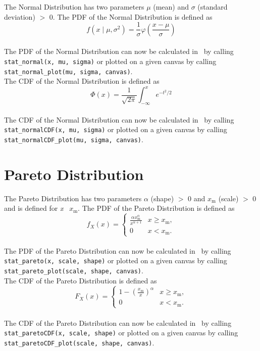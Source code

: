 		The Normal Distribution has two parameters $\mu$ (mean) and $\sigma$ (standard deviation) $>$ 0. The \ac{PDF} of the Normal Distribution is defined as
		\\
		$$f(x \mid \mu, \sigma^2) =\frac 1 \sigma \varphi\left(\frac{x-\mu} \sigma \right)$$
		\\[0.3cm]
		The \ac{PDF} of the Normal Distribution can now be calculated in \setlx\ by calling \lstinline{stat_normal(x, mu, sigma)} or plotted on a given canvas by calling \lstinline{stat_normal_plot(mu, sigma, canvas)}.
		\\[0.3cm]
		The \ac{CDF} of the Normal Distribution is defined as
		\\
		$$\Phi(x) = \frac 1 {\sqrt{2\pi}} \int_{-\infty}^x e^{-t^2/2}$$
		\\[0.3cm]
		The \ac{CDF} of the Normal Distribution can now be calculated in \setlx\ by calling \lstinline{stat_normalCDF(x, mu, sigma)} or plotted on a given canvas by calling \lstinline{stat_normalCDF_plot(mu, sigma, canvas)}.
		
	\section{Pareto Distribution}
	
		The Pareto Distribution has two parameters $\alpha$ (shape) $>$ 0 and $x_\mathrm{m}$ (scale) $>$ 0 and is defined for \textit{x} \geq\ $x_\mathrm{m}$. The \ac{PDF} of the Pareto Distribution is defined as
		\\
		$$f_X(x)= \begin{cases} \frac{\alpha x_\mathrm{m}^\alpha}{x^{\alpha+1}} & x \ge x_\mathrm{m}, \\ 0 & x < x_\mathrm{m}. \end{cases}$$
		\\[0.3cm]
		The \ac{PDF} of the Pareto Distribution can now be calculated in \setlx\ by calling \lstinline{stat_pareto(x, scale, shape)} or plotted on a given canvas by calling \lstinline{stat_pareto_plot(scale, shape, canvas)}.
		\\[0.3cm]
		The \ac{CDF} of the Pareto Distribution is defined as
		\\
		$$F_X(x) = \begin{cases}1-\left(\frac{x_\mathrm{m}}{x}\right)^\alpha & x \ge x_\mathrm{m}, \\0 & x < x_\mathrm{m}.\end{cases}$$
		\\[0.3cm]
		The \ac{CDF} of the Pareto Distribution can now be calculated in \setlx\ by calling \lstinline{stat_paretoCDF(x, scale, shape)} or plotted on a given canvas by calling \lstinline{stat_paretoCDF_plot(scale, shape, canvas)}.
		
